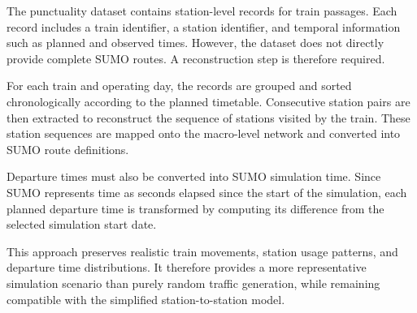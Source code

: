 The punctuality dataset contains station-level records for train passages. Each record includes a train identifier, a 
station identifier, and temporal information such as planned and observed times. However, the dataset does not directly 
provide complete SUMO routes. A reconstruction step is therefore required.

For each train and operating day, the records are grouped and sorted chronologically according to the planned timetable. 
Consecutive station pairs are then extracted to reconstruct the sequence of stations visited by the train. These station 
sequences are mapped onto the macro-level network and converted into SUMO route definitions.

Departure times must also be converted into SUMO simulation time. Since SUMO represents time as seconds elapsed since the 
start of the simulation, each planned departure time is transformed by computing its difference from the selected 
simulation start date.

This approach preserves realistic train movements, station usage patterns, and departure time distributions. It therefore 
provides a more representative simulation scenario than purely random traffic generation, while remaining compatible with 
the simplified station-to-station model.

